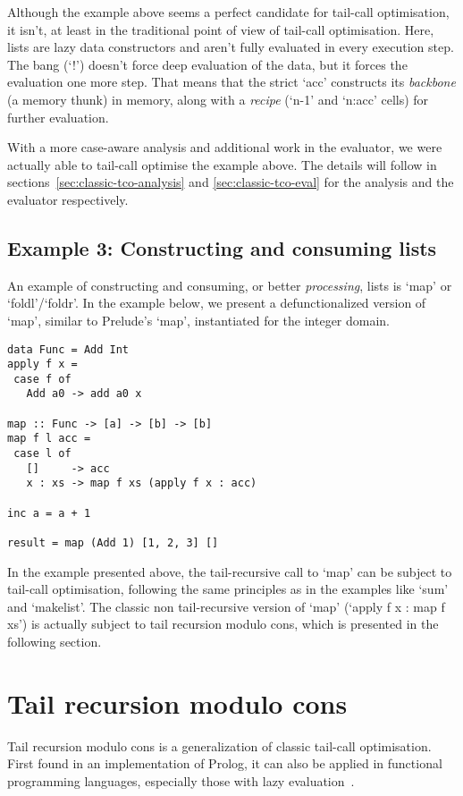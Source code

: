 \documentclass[diploma]{softlab-thesis}
\begin{document}
Although the example above seems a perfect candidate for tail-call optimisation, it isn't, 
at least in the traditional point of view of tail-call optimisation. Here, lists are 
lazy data constructors and aren't fully evaluated in every execution step. The bang (`!') doesn't 
force deep evaluation of the data, but it forces the evaluation one more step. That means that the strict 
`acc' constructs its \textit{backbone} (a memory thunk) in memory, along with a \textit{recipe} 
(`n-1' and `n:acc' cells) for further evaluation. 

With a more case-aware analysis and additional work in the evaluator, 
we were actually able to tail-call optimise the example
above. The details will follow in sections~\ref{sec:classic-tco-analysis} and \ref{sec:classic-tco-eval} for the analysis 
and the evaluator respectively.

\subsection {Example 3: Constructing and consuming lists}
\label{sec:example3}

An example of constructing and consuming, or better \textit{processing}, lists is `map' or `foldl'/`foldr'.
In the example below, we present a defunctionalized version of `map', similar to Prelude's `map', instantiated for
the integer domain.

\begin{verbatim}
data Func = Add Int
apply f x =
 case f of
   Add a0 -> add a0 x

map :: Func -> [a] -> [b] -> [b]
map f l acc =
 case l of
   []     -> acc
   x : xs -> map f xs (apply f x : acc)

inc a = a + 1

result = map (Add 1) [1, 2, 3] []
\end{verbatim}
In the example presented above, 
the tail-recursive call to `map' can be subject to tail-call optimisation, 
following the same principles as in the examples like `sum' and `makelist'. The classic non tail-recursive 
version of `map' (`apply f x : map f xs') is actually subject to tail recursion modulo cons, which is presented 
in the following section.

\section{Tail recursion modulo cons}
\label{sec:modulo-cons-example}

Tail recursion modulo cons is a generalization of classic tail-call optimisation. First found in an 
implementation of Prolog, it can also be applied in
functional programming languages, especially those with lazy evaluation~\cite{Wadler84}.
\end{document}
